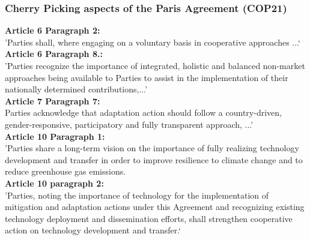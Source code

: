 \begin{frame}

\frametitle{Cherry Picking aspects of the Paris Agreement (COP21)}

\textbf{Article 6 Paragraph 2:}\\
'Parties shall, where engaging on a voluntary basis in cooperative approaches ...‘\\

\textbf{Article 6 Paragraph 8.:}\\
'Parties recognize the importance of integrated, holistic and balanced non-market approaches being available to Parties to assist in the implementation of their nationally determined contributions,...'\\

\textbf{Article 7 Paragraph 7:}\\
Parties acknowledge that adaptation action should follow a country-driven, gender-responsive, participatory and fully transparent approach, ...'\\

\textbf{Article 10 Paragraph 1:}\\
 'Parties share a long-term vision on the importance of fully realizing technology development and transfer in order to improve resilience to climate change and to reduce greenhouse gas emissions.\\

\textbf{Article 10 paragraph 2:}\\
 'Parties, noting the importance of technology for the implementation of mitigation and adaptation actions under this Agreement and recognizing existing technology deployment and dissemination efforts, shall strengthen cooperative action on technology development and transfer.‘\\
\end{frame}

